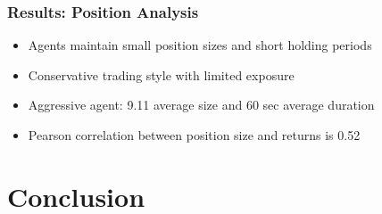 \documentclass{beamer}
\begin{document}
\begin{frame}
  \frametitle{Results: Position Analysis}

  \begin{figure}
    \centering
    \setcounter{subfigure}{0}
  \end{figure}

  \begin{itemize}
    \item Agents maintain small position sizes and short holding periods
    \item Conservative trading style with limited exposure
    \item Aggressive agent: 9.11 average size and 60 sec average duration
    \item Pearson correlation between position size and returns is 0.52
  \end{itemize}

\end{frame}

\section{Conclusion}
\end{document}
